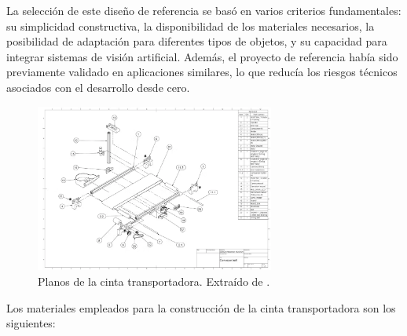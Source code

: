 \documentclass[11pt,spanish,listoffigures,listoftables]{tfgetsinf}
\begin{document}
La selección de este diseño de referencia se basó en varios criterios fundamentales: su simplicidad constructiva, la disponibilidad de los materiales necesarios, la posibilidad de adaptación para diferentes tipos de objetos, y su capacidad para integrar sistemas de visión artificial. Además, el proyecto de referencia había sido previamente validado en aplicaciones similares, lo que reducía los riesgos técnicos asociados con el desarrollo desde cero.

\begin{figure}[H]
   \centering
   \includegraphics[width=0.7\textwidth]{images/prueba_de_concepto/planos_cinta.png}
   \caption[Planos de la cinta transportadora]{Planos de la cinta transportadora. Extraído de \cite{hackster_counting_inspection}.}
   \label{fig:planos_cinta}
\end{figure}

Los materiales empleados para la construcción de la cinta transportadora son los siguientes:
\end{document}
